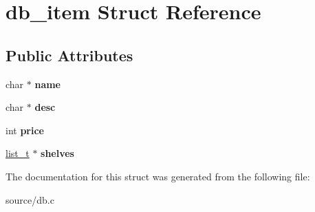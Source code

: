 \hypertarget{structdb__item}{}\section{db\+\_\+item Struct Reference}
\label{structdb__item}
\subsection*{Public Attributes}
\begin{DoxyCompactItemize}
\item 
char $\ast$ {\bfseries name}\hypertarget{structdb__item_ab9bab4d8861b20f503864df6b098cb68}{}\label{structdb__item_ab9bab4d8861b20f503864df6b098cb68}

\item 
char $\ast$ {\bfseries desc}\hypertarget{structdb__item_adbfea335ba7a7b1ae22b9a5aa95d073b}{}\label{structdb__item_adbfea335ba7a7b1ae22b9a5aa95d073b}

\item 
int {\bfseries price}\hypertarget{structdb__item_a0502794d3d544dabbb48743be5630ce1}{}\label{structdb__item_a0502794d3d544dabbb48743be5630ce1}

\item 
\hyperlink{list_8h_a15376354e4e8b4f1732e9df17f30786c}{list\+\_\+t} $\ast$ {\bfseries shelves}\hypertarget{structdb__item_aac695eb6ac1cc729996def8f671bfcab}{}\label{structdb__item_aac695eb6ac1cc729996def8f671bfcab}

\end{DoxyCompactItemize}


The documentation for this struct was generated from the following file\+:\begin{DoxyCompactItemize}
\item 
source/db.\+c\end{DoxyCompactItemize}
